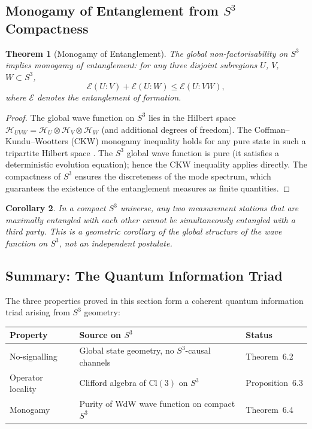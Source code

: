 \documentclass[12pt,a4paper]{article}
\newtheorem{theorem}{Theorem}[section]
\newtheorem{corollary}[theorem]{Corollary}
\theoremstyle{definition}
\theoremstyle{remark}
\begin{document}
\subsection{Monogamy of Entanglement from $S^3$ Compactness}

\begin{theorem}[Monogamy of Entanglement]
\label{thm:monogamy}
The global non-factorisability on $S^3$ implies monogamy of entanglement:
for any three disjoint subregions $U$, $V$, $W\subset S^3$,
\[
\mathcal{E}(U:V) + \mathcal{E}(U:W) \leq \mathcal{E}(U:VW),
\]
where $\mathcal{E}$ denotes the entanglement of formation.
\end{theorem}

\begin{proof}
The global wave function on $S^3$ lies in the Hilbert space
$\mathcal{H}_{UVW} = \mathcal{H}_U\otimes\mathcal{H}_V\otimes\mathcal{H}_W$
(and additional degrees of freedom). The Coffman--Kundu--Wootters (CKW) monogamy
inequality holds for any pure state in such a tripartite Hilbert space \cite{CKW2000}.
The $S^3$ global wave function is pure (it satisfies a deterministic evolution
equation); hence the CKW inequality applies directly. The compactness of $S^3$
ensures the discreteness of the mode spectrum, which guarantees the existence of the
entanglement measures as finite quantities.
\end{proof}

\begin{corollary}
In a compact $S^3$ universe, any two measurement stations that are maximally
entangled with each other cannot be simultaneously entangled with a third party.
This is a geometric corollary of the global structure of the wave function on $S^3$,
not an independent postulate.
\end{corollary}

\subsection{Summary: The Quantum Information Triad}

The three properties proved in this section form a coherent quantum information
triad arising from $S^3$ geometry:

\begin{center}
\renewcommand{\arraystretch}{1.4}
\begin{tabular}{lll}
\toprule
\textbf{Property} & \textbf{Source on $S^3$} & \textbf{Status} \\
\midrule
No-signalling & Global state geometry, no $S^3$-causal channels & Theorem~6.2 \\
Operator locality & Clifford algebra of $\mathrm{Cl}(3)$ on $S^3$ & Proposition~6.3 \\
Monogamy & Purity of WdW wave function on compact $S^3$ & Theorem~6.4 \\
\bottomrule
\end{tabular}
\end{center}
\end{document}
